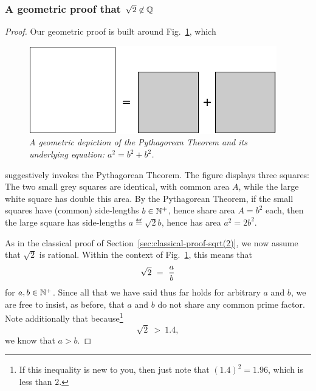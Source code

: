 \subsubsection{A geometric proof that $\sqrt{2} \not\in \mathbb{Q}$}
\label{sec:geom-proof-sqrt(2)}

\begin{proof}
Our geometric proof is built around Fig.~\ref{fig:irrationality1}, which
\begin{figure}[htb]
\begin{center}
       \includegraphics[scale=0.4]{FiguresArithmetic/sqrt2initial}
\caption{{\it A geometric depiction of the Pythagorean Theorem and its
    underlying equation: $a^2 = b^2 + b^2$.}
\label{fig:irrationality1}}
\end{center}
\end{figure}
suggestively invokes the Pythagorean Theorem.  The figure displays three squares: The two small grey squares are identical, with common area $A$, while the large white square has double this area.  By the Pythagorean Theorem, if the small squares have (common) side-lengths $b \in \mathbb{N}^+$, hence share area $A = b^2$ each, then the large square has side-lengths $a \eqdef \sqrt{2}b$, hence has area $a^2 = 2 b^2$.

As in the classical proof of Section~\ref{sec:classical-proof-sqrt(2)}, we now assume that $\sqrt{2}$ is rational.  Within the context of Fig.~\ref{fig:irrationality1}, this means that
\[ \sqrt{2} \ = \ {a \over b} \]
for $a, b \in \mathbb{N}^+$.  Since all that we have said thus far holds for arbitrary $a$ and $b$, we are free to insist, as before, that $a$ and $b$ do not share any common prime factor.  Note additionally that because\footnote{If this inequality is new to you, then just note that $(1.4)^2 = 1.96$, which is less than $2$.}
\[ \sqrt{2} \ > \ 1.4, \]
we know that $a > b$.

\medskip

\noindent {}
\medskip


\end{proof}
